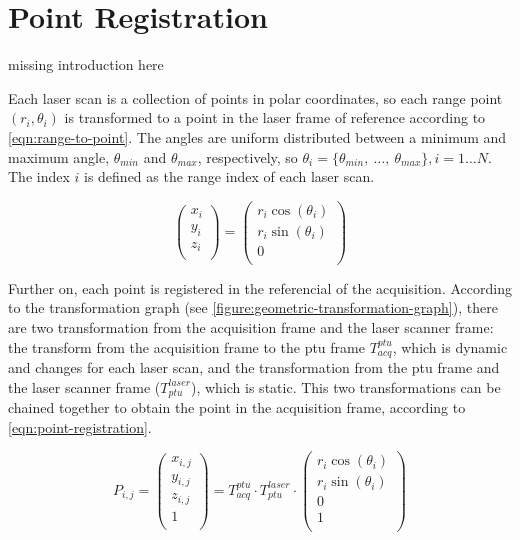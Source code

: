 \section{Point Registration}
\label{section:point-registration}

missing introduction here

Each laser scan is a collection of points in polar coordinates, so each range point $(r_i, \theta_i)$ is transformed to a point in the laser frame of reference according to \cref{eqn:range-to-point}. The angles are uniform distributed between a minimum and maximum angle, $\theta_{min}$ and $\theta_{max}$, respectively, so $\theta_i = \{\theta_{min}, \ \dots, \ \theta_{max}\}, i=1 \dots N$. The index $i$ is defined as the range index of each laser scan.

\begin{equation}\label{eqn:range-to-point}
    \left(
        \begin{array}{c}
            x_i \\
            y_i \\
            z_i \\
        \end{array}
    \right)
    =
    \left(
        \begin{array}{c}
            r_i \cos(\theta_i) \\
            r_i \sin(\theta_i) \\
            0 \\
        \end{array}    
    \right)
\end{equation}

Further on, each point is registered in the referencial of the acquisition. According to the transformation graph (see \cref{figure:geometric-transformation-graph}), there are two transformation from the acquisition frame and the laser scanner frame: the transform from the acquisition frame to the ptu frame $T_{acq}^{ptu}$, which is dynamic and changes for each laser scan, and the transformation from the ptu frame and the laser scanner frame ($T_{ptu}^{laser}$), which is static. This two transformations can be chained together to obtain the point in the acquisition frame, according to \cref{eqn:point-registration}.

\begin{equation}\label{eqn:point-registration}
    P_{i,j} = 
    \left(
        \begin{array}{c}
            x_{i,j} \\ y_{i,j} \\ z_{i,j} \\ 1 \\
        \end{array}    
    \right)
    =
    T_{acq}^{ptu}
    \cdot T_{ptu}^{laser}
    \cdot
    \left(
        \begin{array}{c}
            r_i \cos(\theta_i) \\
            r_i \sin(\theta_i) \\
            0 \\
            1 \\
        \end{array}    
    \right)
\end{equation}

